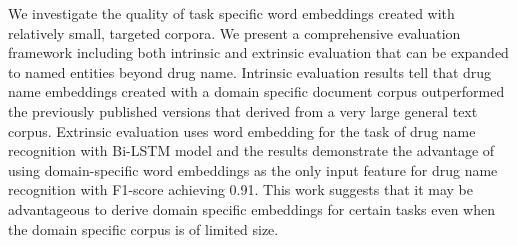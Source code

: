 We investigate the quality of task specific word embeddings created with relatively small, targeted corpora. We present a comprehensive evaluation framework including both intrinsic and extrinsic evaluation that can be expanded to named entities beyond drug name. Intrinsic evaluation results tell that drug name embeddings created with a domain specific document corpus outperformed the previously published versions that derived from a very large general text corpus. Extrinsic evaluation uses word embedding for the task of drug name recognition with Bi-LSTM model and the results demonstrate the advantage of using domain-specific word embeddings as the only input feature for drug name recognition with F1-score achieving 0.91. This work suggests that it may be advantageous to derive domain specific embeddings for certain tasks even when the domain specific corpus is of limited size.
